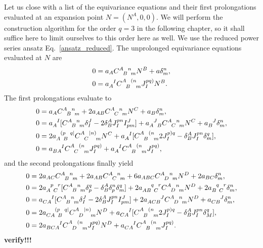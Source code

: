 Let us close with a list of the equivariance equations and their first prolongations evaluated at an expansion point $N = (N^A,0,0)$. We will perform the construction algorithm for the order $q=3$ in the following chapter, so it shall suffice here to limit ourselves to this order here as well. We use the reduced power series ansatz Eq.~\ref{ansatz_reduced}. The unprolonged equivariance equations evaluated at $N$ are
\begin{equation}
  \begin{aligned}
    0 &{} = a_A \gmc{A}{B}{n}{m} N^B + a \delta^n_m, \\
    0 &{} = a_A^{\hphantom AI}\gmc{A}{B}{(n}{m} J^{pq)}_I N^B.
  \end{aligned}
\end{equation}
The first prolongations evaluate to
\begin{equation}
  \begin{aligned}
    0 &{} = a_A \gmc{A}{B}{n}{m} + 2 a_{AB} \gmc{A}{C}{n}{m} N^C + a_B \delta^n_m, \\
    0 &{} = a_A^{\hphantom AI}\lbrack \gmc{A}{B}{n}{m} \delta^J_I - 2\delta^A_B J^{pn}_I I^J_{pm}\rbrack + a_{A\hphantom JB}^{\hphantom AJ}\gmc{A}{C}{n}{m} N^C + a_B^{\hphantom BJ} \delta^n_m, \\
    0 &{} = 2a_{A \hphantom pB}^{\hphantom A(p\hphantom Bq\mid} \gmc{A}{C}{\mid n)}{m} N^C + a_A^{\hphantom AI}\lbrack \gmc{A}{B}{(n}{m} 2J^{p)q}_I - \delta^A_B J^{pn}_I \delta^q_m\rbrack, \\
    0 &{} = a_{BA}^{\hphantom{BA}I} \gmc{A}{C}{(n}{m} J^{pq)}_I + a_A^{\hphantom AI}\gmc{A}{B}{(n}{m} J^{pq)}_I,
  \end{aligned}
\end{equation}
and the second prolongations finally yield
\begin{equation}
  \begin{aligned}
    0 &{} = 2 a_{AC} \gmc{A}{B}{n}{m} + 2 a_{AB} \gmc{A}{C}{n}{m} + 6 a_{ABC} \gmc{A}{D}{n}{m}N^D + 2a_{BC}\delta^n_m, \\
    0 &{} = 2 a_{A\hphantom pC}^{\hphantom Ap\hphantom Cr}\lbrack \gmc{A}{B}{n}{m} \delta^q_p - \delta^A_B\delta^n_p\delta^q_m \rbrack + 2a_{AB\hphantom qC}^{\hphantom{AB}q\hphantom Cr}\gmc{A}{D}{n}{m} N^D + 2a_{B\hphantom qC}^{\hphantom Bq\hphantom Cr}\delta^n_m, \\
    0 &{} = a_{CA}^{\hphantom{CA}I} \lbrack \gmc{A}{B}{n}{m} \delta^J_I - 2 \delta^A_B J^{pn}_I I^J_{pm} \rbrack + 2 a_{ACB}^{\hphantom{ACB}J} \gmc{A}{D}{n}{m} N^D + a_{CB}^{\hphantom{CB}J} \delta^n_m, \\
    0 &{} = 2a_{CA\hphantom{p}B}^{\hphantom{CA}(p\hphantom Bq\mid}\gmc{A}{D}{\mid n)}{m}N^D + a_{CA}^{\hphantom{CA}I} \lbrack \gmc{A}{B}{(n}{m} 2 J^{p)q}_I - \delta^A_B J^{pn}_I \delta^q_M \rbrack, \\
    0 &{} = 2a_{BCA}^{\hphantom{BCA}I} \gmc{A}{D}{(n}{m}J^{pq)}_I N^D + a_{CA}^{\hphantom{CA}I} \gmc{A}{B}{(n}{m} J^{pq)}_I.
  \end{aligned}
\end{equation}
\textbf{verify!!!}
